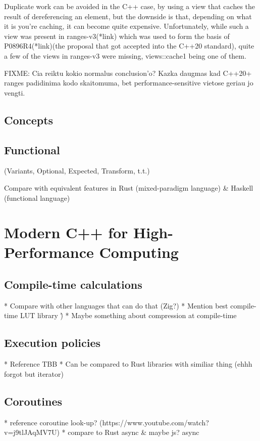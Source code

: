 \documentclass[
    english, %
]{VUMIFPSkursinis}
\begin{document}
Duplicate work can be avoided in the C++ case, by using a view that caches the result of dereferencing an element, but the downside is that, depending on what it is you're caching, it can become quite expensive. Unfortunately, while such a view was present in ranges-v3(*link) which was used to form the basis of P0896R4(*link)(the proposal that got accepted into the C++20 standard), quite a few of the views in ranges-v3 were missing, views::cache1 being one of them.

FIXME: Cia reiktu kokio normalus conclusion'o? Kazka daugmas kad C++20+ ranges padidinima kodo skaitomuma, bet performance-sensitive vietose geriau jo vengti.

\subsection{Concepts}
\subsection{Functional}
(Variants, Optional, Expected, Transform, t.t.)

Compare with equivalent features in Rust (mixed-paradigm language) \& Haskell (functional language)

\section{Modern C++ for High-Performance Computing}

\subsection{Compile-time calculations}
* Compare with other languages that can do that (Zig?)
* Mention best compile-time LUT library \:\^)
* Maybe something about compression at compile-time

\subsection{Execution policies}
* Reference TBB
* Can be compared to Rust libraries with similiar thing (ehhh forgot but iterator)

\subsection{Coroutines}
* reference coroutine look-up? (https://www.youtube.com/watch?v=j9tlJAqMV7U)
* compare to Rust async \& maybe js? async
\end{document}
